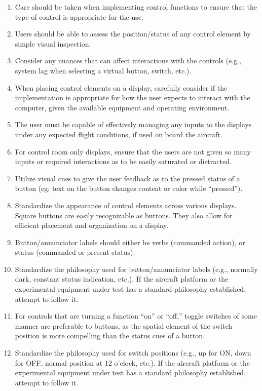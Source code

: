 \documentclass[
]{book}
\providecommand{\tightlist}{%
  \setlength{\itemsep}{0pt}\setlength{\parskip}{0pt}}
\begin{document}
\begin{enumerate}
\begin{enumerate}
    \begin{enumerate}
    \def\labelenumiii{\arabic{enumiii}.}
    \tightlist
    \item
      Care should be taken when implementing control functions to ensure that the type of control is appropriate for the use.
    \item
      Users should be able to assess the position/status of any control element by simple visual inspection.
    \item
      Consider any nuances that can affect interactions with the controls (e.g., system lag when selecting a virtual button, switch, etc.).
    \item
      When placing control elements on a display, carefully consider if the implementation is appropriate for how the user expects to interact with the computer, given the available equipment and operating environment.
    \item
      The user must be capable of effectively managing any inputs to the displays under any expected flight conditions, if used on board the aircraft.
    \item
      For control room only displays, ensure that the users are not given so many inputs or required interactions as to be easily saturated or distracted.
    \item
      Utilize visual cues to give the user feedback as to the pressed status of a button (eg; text on the button changes content or color while ``pressed'').
    \item
      Standardize the appearance of control elements across various displays. Square buttons are easily recognizable as buttons. They also allow for efficient placement and organization on a display.
    \item
      Button/annunciator labels should either be verbs (commanded action), or status (commanded or present status).
    \item
      Standardize the philosophy used for button/annunciator labels (e.g., normally dark, constant status indication, etc.). If the aircraft platform or the experimental equipment under test has a standard philosophy established, attempt to follow it.
    \item
      For controls that are turning a function ``on'' or ``off,'' toggle switches of some manner are preferable to buttons, as the spatial element of the switch position is more compelling than the status cues of a button.
    \item
      Standardize the philosophy used for switch positions (e.g., up for ON, down for OFF, normal position at 12 o'clock, etc.). If the aircraft platform or the experimental equipment under test has a standard philosophy established, attempt to follow it.

\end{enumerate}
\end{enumerate}
\end{enumerate}
\end{document}
